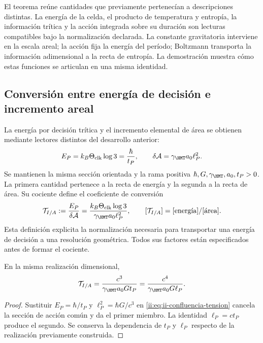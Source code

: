 El teorema reúne cantidades que previamente pertenecían a descripciones
distintas. La energía de la celda, el producto de temperatura y entropía,
la información trítica y la acción integrada sobre su duración son
lecturas compatibles bajo la normalización declarada. La constante
gravitatoria interviene en la escala areal; la acción fija la energía
del período; Boltzmann transporta la información adimensional a la
recta de entropía. La demostración muestra cómo estas funciones se
articulan en una misma identidad.

\subsection{Conversión entre energía de decisión e incremento areal}
\label{ii:sec:ii-conversion-informacion-area}

La energía por decisión trítica y el incremento elemental de área se
obtienen mediante lectores distintos del desarrollo anterior:
\begin{equation}
 E_P=k_B\Theta_{\rm clk}\log3=\frac{\hbar}{t_P},
 \qquad
 \delta\mathcal A=\gamma_{\HMT}a_0\ell_P^2.
 \label{ii:eq:ii-confluencia-cuanto-energia-area}
\end{equation}
Se mantienen la misma sección orientada y la rama positiva
\(\hbar,G,\gamma_{\HMT},a_0,t_P>0\). La primera cantidad
pertenece a la recta de energía y la segunda a la recta de área.
Su cociente define el coeficiente de conversión
\begin{equation}
 \mathcal T_{I/A}
 :=\frac{E_P}{\delta\mathcal A}
 =\frac{k_B\Theta_{\rm clk}\log3}
        {\gamma_{\HMT}a_0\ell_P^2},
 \qquad [\mathcal T_{I/A}]=[\text{energía}]/[\text{área}].
 \label{ii:eq:ii-confluencia-tension}
\end{equation}
Esta definición explicita la normalización necesaria para transportar
una energía de decisión a una resolución geométrica. Todos sus factores
están especificados antes de formar el cociente.

\begin{proposition}
\label{ii:prop:ii-confluencia-tension}
En la misma realización dimensional,
\begin{equation}
 \mathcal T_{I/A}
 =\frac{c^3}{\gamma_{\HMT}a_0G t_P}
 =\frac{c^4}{\gamma_{\HMT}a_0G\ell_P}.
 \label{ii:eq:ii-confluencia-tension-gravedad}
\end{equation}
\end{proposition}
\begin{proof}
Sustituir \(E_P=\hbar/t_P\) y \(\ell_P^2=\hbar G/c^3\)
en \eqref{ii:eq:ii-confluencia-tension} cancela la sección de acción
común y da el primer miembro. La identidad \(\ell_P=ct_P\)
produce el segundo. Se conserva la dependencia de \(t_P\) y
\(\ell_P\) respecto de la realización previamente construida.
\end{proof}

